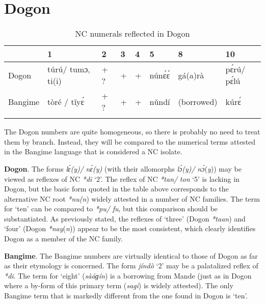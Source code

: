 \clearpage
\section{Dogon}%

\begin{table}
\caption{\label{tab:5:8}NC numerals reflected in Dogon}


\begin{tabularx}{\textwidth}{lllllllQ} 
\lsptoprule
& {1} & {2} & {3} & {4} & {5} & {8} & {10}\\
\midrule 
{Dogon} & {t{\'{u}}r{\'{u}}/} {tumɔ,} {ti(i)} & {+} ?  & {+} & {+} & {n{\'{u}}n{\'{ɛ}}{\'{ɛ}}} & {gá(a)rà} & {p{\'{ɛ}}r{\'{u}}/} {p{\'{ɛ}}l{\'{u}}}\\
{Bangime} & {tòré} {/} {t{\v{i}}y{\'{ɛ}}} & {+} ?  & {+} & {+} & {n{\v{u}}ndí} & {(borrowed)} & {k{\'{u}}r{\'{ɛ}}}\\
\lspbottomrule
\end{tabularx}
\end{table}
The Dogon numbers are quite homogeneous, so there is probably no need to treat them by branch. Instead, they will be compared to the numerical terms attested in the Bangime language that is considered a NC isolate. 

\textbf{Dogon}. The forms \textit{l{\'{ɛ}}(}\textit{y)/} \textit{n{\'{ɛ}}(}\textit{y)} (with their allomorphs \textit{l{\'{ɔ}}(}\textit{y)/} \textit{n{\'{ɔ}}}(\textit{y})) may be viewed as reflexes of NC \textit{*di} ‘2’. The reflex of  NC \textit{*tan}\textit{/} \textit{ton}  ‘5’ is lacking in Dogon, but the basic form quoted in the table above corresponds to the alternative NC root \textit{*nu}\textit{(n}) widely attested in a number of NC families. The term for ‘ten’ can be compared to \textit{*pu}\textit{/} \textit{fu}, but this comparison should be substantiated. As previously stated, the reflexes of ‘three’ (Dogon \textit{*taan}) and ‘four’ (Dogon \textit{*nay}(\textit{n})) appear to be the most consistent, which clearly identifies Dogon as a member of the NC family.

\textbf{Bangime}. The Bangime numbers are virtually identical to those of Dogon as far as their etymology is concerned. The form \textit{jíndò} ‘2’ may be a palatalized reflex of \textit{*di}. The term for ‘eight’ (\textit{sàáɡín}) is a borrowing from Mande (just as in Dogon where a by-form of this primary term (\textit{sagi}) is widely attested). The only Bangime term that is markedly different from the one found in Dogon is ‘ten’.

